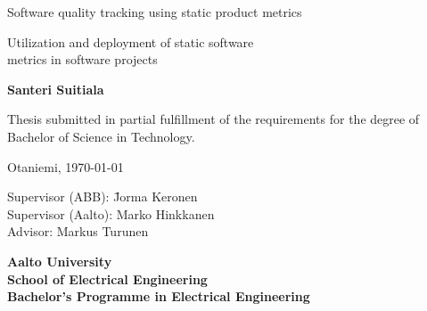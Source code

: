 {\parindent0pt %
\begin{spacing}{1.1}

 {\sffamily{}}
\end{spacing}

\vspace{12.7mm}

\begin{spacing}{1.63}
{\fontsize{17.8pt}{17.8pt}\selectfont Software quality tracking using static product metrics}
\end{spacing}

\vspace{10.5mm}

\begin{spacing}{1.2}
{\fontsize{13pt}{13pt}\selectfont Utilization and deployment of static software \\metrics in software projects}
\end{spacing}

\vspace{10.6mm}

{\fontsize{13.9pt}{13.9pt}\bfseries\sffamily\lsstyle Santeri Suitiala}

\vfill

{\fontsize{10.3pt}{10.3pt}\sffamily\lsstyle\raggedright
\begin{spacing}{1.06}

Thesis submitted in partial fulfillment of the requirements for the
degree of Bachelor of Science in Technology.

Otaniemi, \today

\begin{tabbing}
Supervisor (ABB):\hspace{6mm} \= Jorma Keronen \\
Supervisor (Aalto):\> Marko Hinkkanen \\
Advisor: \> Markus Turunen
\end{tabbing}
\vspace{-4mm}
\end{spacing}
} %

\vspace{11.5mm}

\begin{spacing}{.9}
{\bfseries\sffamily\lsstyle Aalto University \\
School of Electrical Engineering \\
Bachelor’s Programme in Electrical Engineering}
\end{spacing}
} %



